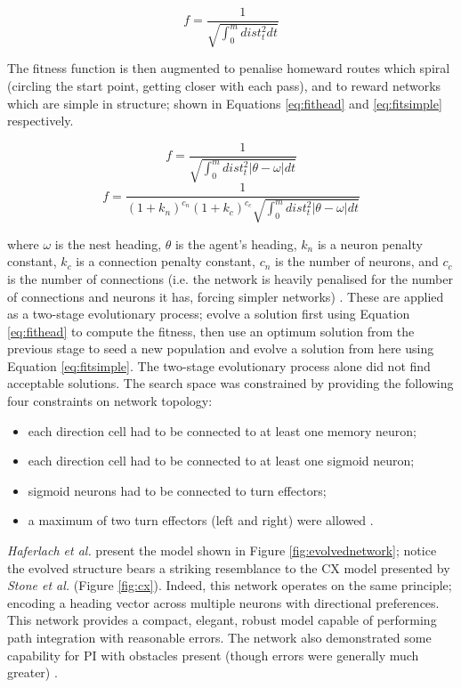 \documentclass[a4paper,11pt,twoside,openright]{article}
\begin{document}
\begin{equation}
 f = \frac{1}{\sqrt{\int_{0}^m dist_t^2 dt}}
\end{equation}

The fitness function is then augmented to penalise homeward routes which
spiral (circling the start point, getting closer with each pass), and
to reward networks which are simple in structure; shown in
Equations \ref{eq:fithead} and \ref{eq:fitsimple} respectively.

\begin{equation}
  \label{eq:fithead}
  f = \frac{1}{\sqrt{\int_{0}^m dist_t^2 |\theta - \omega | dt}}
\end{equation}
\begin{equation}
  \label{eq:fitsimple}
  f = \frac{1}{(1 + k_n)^{c_n}(1 + k_c)^{c_c}
    \sqrt{\int_{0}^m dist_t^2 |\theta - \omega | dt}}
\end{equation}

where $\omega$ is the nest heading, $\theta$ is the agent's heading,
$k_n$ is a neuron penalty constant, $k_c$ is a connection penalty
constant, $c_n$ is the number of neurons, and $c_c$ is the number of
connections (i.e.  the network is heavily penalised for the number of
connections and neurons it has, forcing simpler networks)
\cite{Haferlach2007}. These are applied as a two-stage evolutionary
process; evolve a solution first using Equation \ref{eq:fithead} to
compute the fitness, then use an optimum solution from the previous
stage to seed a new population and evolve a solution from here using
Equation \ref{eq:fitsimple}. The two-stage evolutionary process alone
did not find acceptable solutions. The search space was constrained by
providing the following four constraints on network topology:

\begin{itemize}
\item{each direction cell had to be connected to at least one memory neuron;}
\item{each direction cell had to be connected to at least one sigmoid neuron;}
\item{sigmoid neurons had to be connected to turn effectors;}
\item{a maximum of two turn effectors (left and right) were allowed
  \cite{Haferlach2007}.}
\end{itemize}


\textit{Haferlach et al.} present the model shown in Figure
\ref{fig:evolvednetwork}; notice the evolved structure bears a striking
resemblance to the CX model presented by \textit{Stone et al.} (Figure
\ref{fig:cx}). Indeed, this network operates on the same principle; encoding
a heading vector across multiple neurons with directional preferences. This
network provides a compact, elegant, robust model capable of performing
path integration with reasonable errors. The network also demonstrated
some capability for PI with obstacles present (though errors were generally much
greater) \cite{Haferlach2007}.
\end{document}
